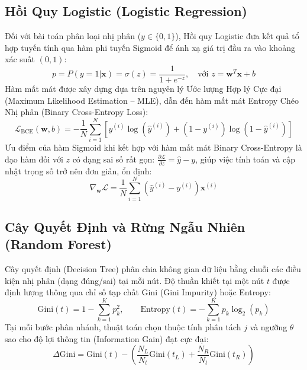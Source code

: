 \documentclass[12pt,a4paper]{report}
\begin{document}
\subsection{Hồi Quy Logistic (Logistic Regression)}
Đối với bài toán phân loại nhị phân ($y \in \{0, 1\}$), Hồi quy Logistic đưa kết quả tổ hợp tuyến tính qua hàm phi tuyến Sigmoid để ánh xạ giá trị đầu ra vào khoảng xác suất $(0, 1)$:
\begin{equation}
p = P(y=1|\mathbf{x}) = \sigma(z) = \frac{1}{1 + e^{-z}}, \quad \text{với } z = \mathbf{w}^T \mathbf{x} + b
\end{equation}
Hàm mất mát được xây dựng dựa trên nguyên lý Ước lượng Hợp lý Cực đại (Maximum Likelihood Estimation -- MLE), dẫn đến hàm mất mát Entropy Chéo Nhị phân (Binary Cross-Entropy Loss):
\begin{equation}
\mathcal{L}_{\text{BCE}}(\mathbf{w}, b) = -\frac{1}{N} \sum_{i=1}^N \left[ y^{(i)} \log(\hat{y}^{(i)}) + (1 - y^{(i)}) \log(1 - \hat{y}^{(i)}) \right]
\end{equation}
Ưu điểm của hàm Sigmoid khi kết hợp với hàm mất mát Binary Cross-Entropy là đạo hàm đối với $z$ có dạng sai số rất gọn: $\frac{\partial \mathcal{L}}{\partial z} = \hat{y} - y$, giúp việc tính toán và cập nhật trọng số trở nên đơn giản, ổn định:
\begin{equation}
\nabla_{\mathbf{w}} \mathcal{L} = \frac{1}{N} \sum_{i=1}^N (\hat{y}^{(i)} - y^{(i)}) \mathbf{x}^{(i)}
\end{equation}

\subsection{Cây Quyết Định và Rừng Ngẫu Nhiên (Random Forest)}
Cây quyết định (Decision Tree) phân chia không gian dữ liệu bằng chuỗi các điều kiện nhị phân (dạng đúng/sai) tại mỗi nút. Độ thuần khiết tại một nút $t$ được định lượng thông qua chỉ số tạp chất Gini (Gini Impurity) hoặc Entropy:
\begin{equation}
\text{Gini}(t) = 1 - \sum_{k=1}^K p_k^2, \qquad \text{Entropy}(t) = -\sum_{k=1}^K p_k \log_2(p_k)
\end{equation}
Tại mỗi bước phân nhánh, thuật toán chọn thuộc tính phân tách $j$ và ngưỡng $\theta$ sao cho độ lợi thông tin (Information Gain) đạt cực đại:
\begin{equation}
\Delta \text{Gini} = \text{Gini}(t) - \left( \frac{N_L}{N_t} \text{Gini}(t_L) + \frac{N_R}{N_t} \text{Gini}(t_R) \right)
\end{equation}
\end{document}
